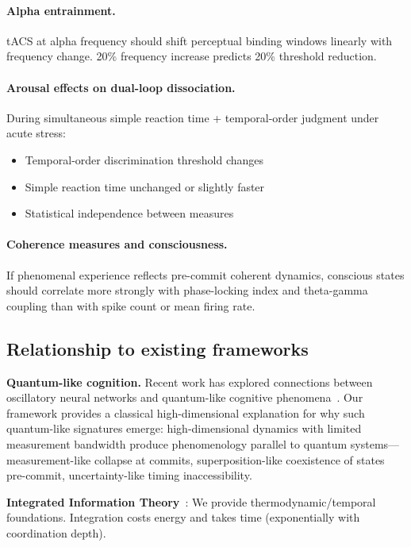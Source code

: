 \documentclass[12pt]{article}
\begin{document}
\paragraph{Alpha entrainment.}
tACS at alpha frequency should shift perceptual binding windows linearly with frequency change. 20\% frequency increase predicts 20\% threshold reduction.

\paragraph{Arousal effects on dual-loop dissociation.}
During simultaneous simple reaction time + temporal-order judgment under acute stress:
\begin{itemize}
\item Temporal-order discrimination threshold changes
\item Simple reaction time unchanged or slightly faster
\item Statistical independence between measures
\end{itemize}

\paragraph{Coherence measures and consciousness.}
If phenomenal experience reflects pre-commit coherent dynamics, conscious states should correlate more strongly with phase-locking index and theta-gamma coupling than with spike count or mean firing rate.

\subsection{Relationship to existing frameworks}

\textbf{Quantum-like cognition.} Recent work has explored connections between oscillatory neural networks and quantum-like cognitive phenomena~\cite{khrennikov2025bridge}. Our framework provides a classical high-dimensional explanation for why such quantum-like signatures emerge: high-dimensional dynamics with limited measurement bandwidth produce phenomenology parallel to quantum systems---measurement-like collapse at commits, superposition-like coexistence of states pre-commit, uncertainty-like timing inaccessibility.

\textbf{Integrated Information Theory}~\cite{tononi2016}: We provide thermodynamic/temporal foundations. Integration costs energy and takes time (exponentially with coordination depth).
\end{document}
